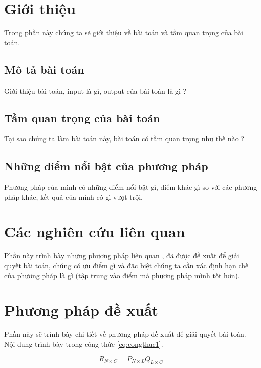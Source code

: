 \documentclass{FR16}
\begin{document}
\maketitle

\tableofcontents
\newpage

\section{Giới thiệu}
Trong phần này chúng ta sẽ giới thiệu về bài toán và tầm quan trọng của bài toán.
\subsection{Mô tả bài toán}
Giới thiệu bài toán, input là gì, output của bài toán là gì ?

\subsection{Tầm quan trọng của bài toán}
Tại sao chúng ta làm bài toán này, bài toán có tầm quan trọng như thế nào ?

\subsection{Những điểm nổi bật của phương pháp}
Phương pháp của mình có những điểm nổi bật gì, điểm khác gì so với các phương pháp khác, kết quả của mình có gì vượt trội.

\newpage

\section{Các nghiên cứu liên quan}
Phần này trình bày những phương pháp liên quan \cite{baibao1}, \cite{baibao2} đã được đề xuất để giải quyết bài toán, chúng có ưu điểm gì và đặc biệt chúng ta cần xác định hạn chế của phương pháp là gì (tập trung vào điểm mà phương pháp mình tốt hơn).

\newpage
\section{Phương pháp đề xuất}
Phần này sẽ trình bày chi tiết về phương pháp đề xuất để giải quyết bài toán.
\newpage
Nội dung trình bày trong công thức \ref{eq:congthuc1}.

\begin{equation}
	R_{N \times C} = P_{N \times L} Q_{L \times C}
	\label{eq:congthuc1}
\end{equation}
\end{document}
